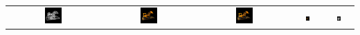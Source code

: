 \begin{table}[!htb]
\begin{tabular*}{\textwidth}{ c c c c c }
          \includegraphics[width=0.19\textwidth]{figures/results/arb_set/validation/lego7_exva_hdrflip_150k.png}
        & \includegraphics[width=0.19\textwidth]{figures/results/arb_set/validation/lego7_exva_150k.png}
        & \includegraphics[width=0.19\textwidth]{figures/results/arb_set/validation/lego7_targ_256px.png}
        & \includegraphics[width=0.19\textwidth]{figures/results/arb_set/validation/lego7_exbf_112k.png}
        & \includegraphics[width=0.19\textwidth]{figures/results/arb_set/validation/lego7_exbf_hdrflip_112k.png} \\[-6pt]
        

\end{tabular*}
\end{table}
